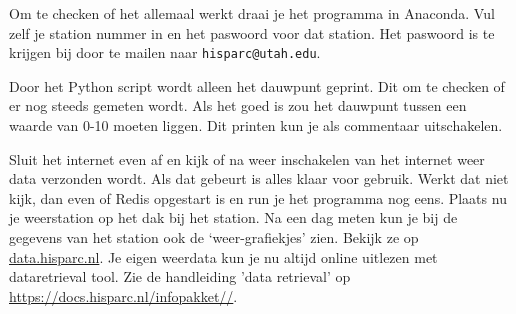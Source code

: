Om te checken of het allemaal werkt draai je het programma in Anaconda. Vul zelf
je \hisparc station nummer in en het paswoord voor dat station. Het paswoord is te krijgen
bij \hisparc door te mailen naar \verb|hisparc@utah.edu|.

Door het Python script wordt alleen het dauwpunt geprint. Dit om te checken
of er nog steeds gemeten wordt. Als het goed is zou het dauwpunt tussen
een waarde van 0-10 moeten liggen. Dit printen kun je als commentaar uitschakelen.

Sluit het internet even af en kijk of na weer inschakelen van het internet weer
data verzonden wordt. Als dat gebeurt is alles klaar voor gebruik.
Werkt dat niet kijk, dan even of Redis opgestart is en run je het programma
nog eens.
Plaats nu je weerstation op het dak bij het station. Na een dag meten kun je
bij de gegevens van het station ook de `weer-grafiekjes' zien. Bekijk ze op
\url{data.hisparc.nl}.
Je eigen weerdata kun je nu altijd online uitlezen met dataretrieval tool. Zie de handleiding
'data retrieval' op \url{https://docs.hisparc.nl/infopakket//}.


